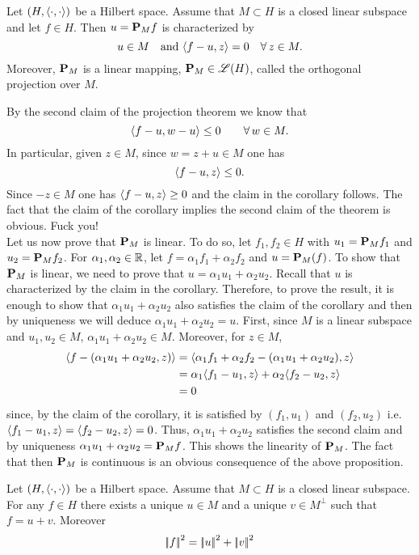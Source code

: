 \documentclass{article}
\begin{document}
\begin{corollary}
	Let $\left(H,\langle \cdot,\cdot \rangle\right)$ be a Hilbert space. Assume that $M\subset H$ is a closed linear subspace and let $f\in H$. Then $u=\mathbf{P}_{M}f$ is characterized by
	\begin{equation*}
		u\in M\quad\text{and }\langle f-u,z \rangle=0\quad\forall\, z\in M.
	\end{equation*}
	Moreover, $\mathbf{P}_{M}$ is a linear mapping, $\mathbf{P}_{M}\in\mathscr{L}(H)$, called the orthogonal projection over $M$.
\end{corollary}
\begin{fancyproof}
	By the second claim of the projection theorem we know that 
	\begin{equation*}
		\langle f-u,w-u \rangle\leq 0\qquad\forall\, w\in M.
	\end{equation*}
	In particular, given $z\in M$, since $w=z+u\in M$ one has
	\begin{equation*}
		\langle f-u,z \rangle\leq0.
	\end{equation*}
	Since $-z\in M$ one has $\langle f-u,z \rangle\geq0$ and the claim in the corollary follows. The fact that the claim of the corollary implies the second claim of the theorem is obvious. Fuck you!\\
	Let us now prove that $\mathbf{P}_{M}$ is linear. To do so, let $f_{1},f_{2}\in H$ with $u_{1}=\mathbf{P}_{M}f_{1}$ and $u_{2}=\mathbf{P}_{M}f_{2}$. For $\alpha_{1},\alpha_{2}\in\mathbb{R}$, let $f=\alpha_{1}f_{1}+\alpha_{2}f_{2}$ and $u=\mathbf{P}_{M}(f)$. To show that $\mathbf{P}_{M}$ is linear, we need to prove that $u=\alpha_{1}u_{1}+\alpha_{2}u_{2}$. Recall that $u$ is characterized by the claim in the corollary. Therefore, to prove the result, it is enough to show that $\alpha_{1}u_{1}+\alpha_{2}u_{2}$ also satisfies the claim of the corollary and then by uniqueness we will deduce $\alpha_{1}u_{1}+\alpha_{2}u_{2}=u$. First, since $M$ is a linear subspace and $u_{1},u_{2}\in M$, $\alpha_{1}u_{1}+\alpha_{2}u_{2}\in M$. Moreover, for $z\in M$,
	\begin{align*}
		\langle f-(\alpha_{1}u_{1}+\alpha_{2}u_{2},z) \rangle&=\langle \alpha_{1}f_{1}+\alpha_{2}f_{2}-(\alpha_{1}u_{1}+\alpha_{2}u_{2}),z \rangle\\
		&=\alpha_{1}\langle f_{1}-u_{1},z \rangle+\alpha_{2}\langle f_{2}-u_{2},z \rangle\\
		&=0
	\end{align*}
	since, by the claim of the corollary, it is satisfied by $(f_{1},u_{1})$ and $(f_{2},u_{2})$ i.e. $\langle f_{1}-u_{1},z \rangle=\langle f_{2}-u_{2},z \rangle=0$. Thus, $\alpha_{1}u_{1}+\alpha_{2}u_{2}$ satisfies the second claim and by uniqueness $\alpha_{1}u_{1}+\alpha_{2}u_{2}=\mathbf{P}_{M}f$. This shows the linearity of $\mathbf{P}_{M}$. The fact that then $\mathbf{P}_{M}$ is continuous is an obvious consequence of the above proposition.
\end{fancyproof}
\begin{corollary}
	Let $\left(H,\langle \cdot,\cdot \rangle\right)$ be a Hilbert space. Assume that $M\subset H$ is a closed linear subspace. For any $f\in H$ there exists a unique $u\in M$ and a unique $v\in M^{\perp}$ such that $f=u+v$. Moreover
	\begin{equation*}
		\left|\negthinspace\left|f\right|\negthinspace\right|^{2}=\left|\negthinspace\left|u\right|\negthinspace\right|^{2}+\left|\negthinspace\left|v\right|\negthinspace\right|^{2}
	\end{equation*}
\end{corollary}
\end{document}
